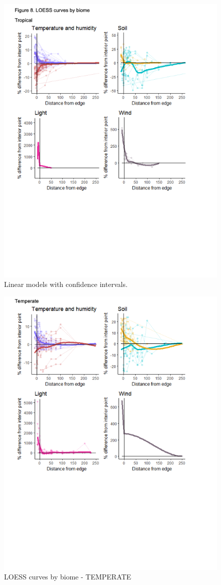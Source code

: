 \documentclass[
  man]{apa6}
\begin{document}
\begin{figure}[H]

{\centering \includegraphics[width=0.8\linewidth,]{images/temp_00006} 

}

\caption{Linear models with confidence intervals.}\label{fig:lin-dist}
\end{figure}

\begin{figure}[H]

{\centering \includegraphics[width=0.8\linewidth,]{images/temp_00005} 

}

\caption{LOESS curves by biome - TEMPERATE}\label{fig:loess-temp}
\end{figure}
\end{document}
